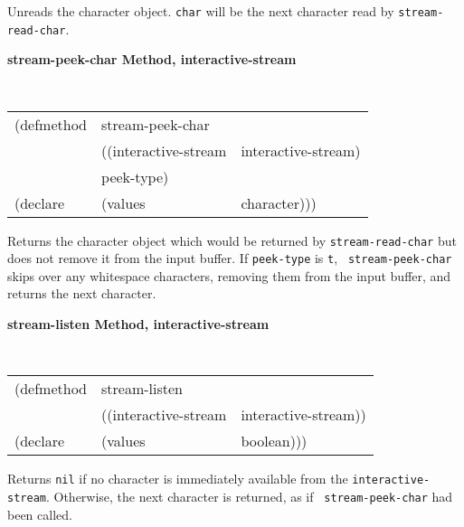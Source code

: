 \begin{flushright} \parbox[t]{6.125in}{
Unreads the character object. {\tt char} will be the next character read by
{\tt stream-read-char}.

}\end{flushright}


{\samepage
{\large {\bf stream-peek-char \hfill Method, interactive-stream}}
\begin{flushright} \parbox[t]{6.125in}{
\tt
\begin{tabular}{lll}
\raggedright
(defmethod & stream-peek-char & \\
& ((interactive-stream  &interactive-stream)\\
& peek-type)\\
(declare &(values &character)))
\end{tabular}
\rm

}\end{flushright}}

\begin{flushright} \parbox[t]{6.125in}{
Returns the character object which would be returned by {\tt stream-read-char} but does
not remove it from the input buffer. If {\tt peek-type} is {\tt t}, {\tt
stream-peek-char} skips over any whitespace characters, removing them from the
input buffer, and returns the next character.

}\end{flushright}



{\samepage
{\large {\bf stream-listen \hfill Method, interactive-stream}}
\begin{flushright} \parbox[t]{6.125in}{
\tt
\begin{tabular}{lll}
\raggedright
(defmethod & stream-listen & \\
& ((interactive-stream  &interactive-stream))\\
(declare &(values &boolean)))
\end{tabular}
\rm

}\end{flushright}}

\begin{flushright} \parbox[t]{6.125in}{
Returns {\tt nil} if no character is immediately available from the
{\tt interactive-stream}. Otherwise, the next character is returned, as if {\tt
stream-peek-char} had been called.}

\end{flushright}

